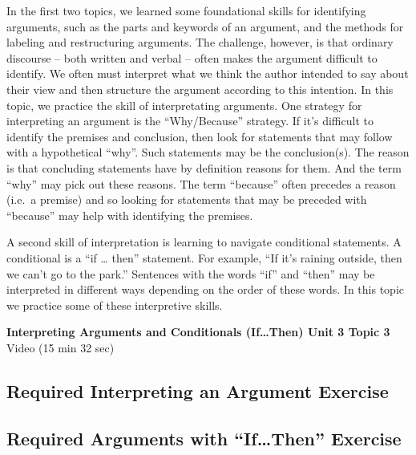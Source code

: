 \documentclass[
]{book}
\begin{document}
In the first two topics, we learned some foundational skills for identifying arguments, such as the parts and keywords of an argument, and the methods for labeling and restructuring arguments. The challenge, however, is that ordinary discourse -- both written and verbal -- often makes the argument difficult to identify. We often must interpret what we think the author intended to say about their view and then structure the argument according to this intention. In this topic, we practice the skill of interpretating arguments. One strategy for interpreting an argument is the ``Why/Because'' strategy. If it's difficult to identify the premises and conclusion, then look for statements that may follow with a hypothetical ``why''. Such statements may be the conclusion(s). The reason is that concluding statements have by definition reasons for them. And the term ``why'' may pick out these reasons. The term ``because'' often precedes a reason (i.e.~a premise) and so looking for statements that may be preceded with ``because'' may help with identifying the premises.

A second skill of interpretation is learning to navigate conditional statements. A conditional is a ``if \ldots{} then'' statement. For example, ``If it's raining outside, then we can't go to the park.'' Sentences with the words ``if'' and ``then'' may be interpreted in different ways depending on the order of these words. In this topic we practice some of these interpretive skills.

\textbf{Interpreting Arguments and Conditionals (If\ldots Then) Unit 3 Topic 3} Video (15 min 32 sec)

\hypertarget{required-interpreting-an-argument-exercise}{%
\subsection*{Required Interpreting an Argument Exercise}\label{required-interpreting-an-argument-exercise}}

\begin{reflect}
\end{reflect}

\hypertarget{required-arguments-with-ifthen-exercise}{%
\subsection*{Required Arguments with ``If\ldots Then'' Exercise}\label{required-arguments-with-ifthen-exercise}}
\end{document}
